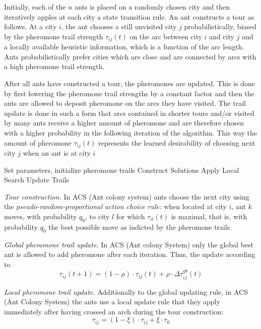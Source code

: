 \documentclass[12pt]{article}
\begin{document}
Initially, each of the \(n\) ants is placed on a randomly chosen city and then iteratively apples at each city a state transition rule. An ant constructs a tour as follows. At a city \(i\), the ant chooses a still unvisited city \(j\) probabilistically, biased by the pheromone trail strength \(\tau_{ij}(t)\) on the arc between city \(i\) and city \(j\) and a locally available heuristic information, which is a function of the arc length. Ants probabilistically prefer cities which are close and are connected by arcs with a high pheromone trail strength.

After all ants have constructed a tour, the pheromones are updated. This is done by first lowering the pheromone trail strengths by a constant factor and then the ants are allowed to deposit pheromone on the arcs they have visited. The trail update is done in such a form that arcs contained in shorter tours and/or visited by many ants receive a higher amount of pheromone and are therefore chosen with a higher probability in the following iteration of the algorithm. This way the amount of pheromone \(\tau_{ij}(t)\) represents the learned desirability of choosing next city \(j\) when an ant is at city \(i\)
\begin{algorithmic}[1]
    \State Set parameters, initialize pheromone trails
    \State Construct Solutions
    \State Apply Local Search 
    \State Update Trails
    \EndWhile
    \EndProcedure
\end{algorithmic}

\textit{Tour construction. } In ACS (Ant colony system) ants choose the next city using the \textit{pseudo-random-proportional action choice rule: } when located at city \(i\), ant \(k\) moves, with probability \(q_0\), to city \(l\) for which \(\tau_{il}(t)\) is maximal, that is, with probability \(q_0\) the best possible move as indicted by the pheromone trails.

\textit{Global pheromone trail update. } In ACS (Ant colony System) only the global best ant is allowed to add pheromone after each iteration. Thus, the update according to
\begin{equation}
    \tau_{ij}(t +1) = (1 - \rho) \cdot \tau_{ij}(t) + \rho \cdot \Delta \tau^{gb}_{ij}(t)
\end{equation}

\textit{Local pheromone trail update. } Additionally to the global updating rule, in ACS (Ant Colony System) the ants use a local update rule that they apply immediately after having crossed an arch during the tour construction:
\begin{equation}
    \tau_{ij} = (1 - \xi) \cdot \tau_{ij} + \xi \cdot \tau_0
\end{equation}
\end{document}
